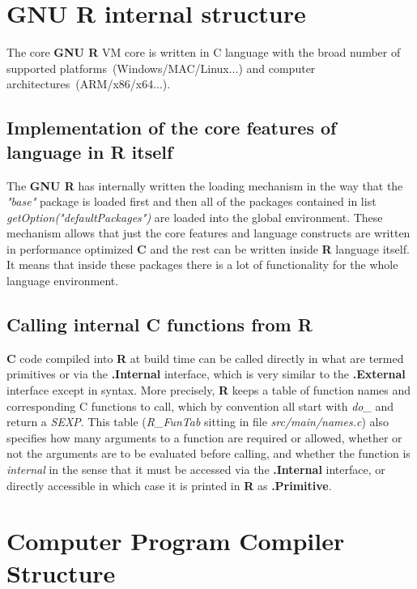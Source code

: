 \documentclass[thesis=M,english]{FITthesis}[2018/10/20]
\begin{document}
\section{GNU R internal structure}\label{R-internal-structure}

The core \textbf{GNU R} VM core is written in C language with the broad number of supported platforms~(Windows/MAC/Linux...) and computer architectures~(ARM/x86/x64...).

\subsection{Implementation of the core features of language in R itself}

The \textbf{GNU R} has internally written the loading mechanism in the way that the \textit{"base"} package is loaded first and then all of the packages contained in list \textit{getOption("defaultPackages")} are loaded into the global environment. These mechanism allows that just the core features and language constructs are written in performance optimized \textbf{C} and the rest can be written inside \textbf{R} language itself. It means that inside these packages there is a lot of functionality for the whole language environment.

\subsection{Calling internal C functions from R}

\textbf{C} code compiled into \textbf{R} at build time can be called directly in what are termed primitives or via the \textbf{.Internal} interface, which is very similar to the \textbf{.External} interface except in syntax. More precisely, \textbf{R} keeps a table of function names and corresponding C functions to call, which by convention all start with \textit{do{\_}} and return a \textit{SEXP}. This table (\textit{R{\_}FunTab} sitting in file \textit{src/main/names.c}) also specifies how many arguments to a function are required or allowed, whether or not the arguments are to be evaluated before calling, and whether the function is \textit{internal} in the sense that it must be accessed via the \textbf{.Internal} interface, or directly accessible in which case it is printed in \textbf{R} as \textbf{.Primitive}.

\section{Computer Program Compiler Structure}
\end{document}
